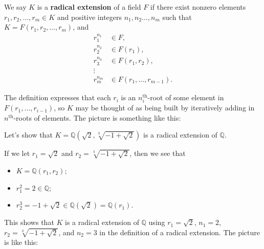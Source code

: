 \begin{definition}
We say $K$ is a \textbf{radical extension} of a field $F$ if there exist nonzero elements $r_1,r_2,\ldots,r_m\in K$ and positive integers $n_1,n_2\ldots,n_m$ such that $K = F(r_1,r_2,\ldots,r_m)$, and 
\begin{align*}
 r_1^{n_1} &\in F,\\
 r_2^{n_2} &\in F(r_1),\\
 r_3^{n_3} &\in F(r_1,r_2),\\
 \vdots & \\
 r_m^{n_m} &\in F(r_1,\ldots,r_{m-1}).
\end{align*}
\end{definition}
The definition expresses that each $r_i$ is an $n_i^\text{th}$-root of some element in $F(r_1,\ldots,r_{i-1})$, so $K$ may be thought of as being built by iteratively adding in $n^\text{th}$-roots of elements. The picture is something like this:
\begin{center}
\end{center}

\begin{example}
Let's show that $K= \mathbb{Q}\left(\sqrt{2},\sqrt[3]{-1 + \sqrt{2}}\right)$ is a radical extension of $\mathbb{Q}$. 

If we let $r_1 = \sqrt{2}$ and $r_2 = \sqrt[3]{-1 + \sqrt{2}}$, then we see that
\begin{itemize}
\item $K = \mathbb{Q}\left(r_1,r_2\right)$;
\item $r_1^2 = 2 \in \mathbb{Q}$; 
\item $r_2^3 = -1 + \sqrt{2} \in \mathbb{Q}\left(\sqrt{2}\right) = \mathbb{Q}\left(r_1\right)$.
\end{itemize}
This shows that $K$ is a radical extension of $\mathbb{Q}$ using $r_1 = \sqrt{2}$, $n_1 = 2$, $r_2 = \sqrt[3]{-1 + \sqrt{2}}$, and $n_2 = 3$ in the definition of a radical extension. The picture is like this:
\begin{center}
\end{center}
\end{example}

